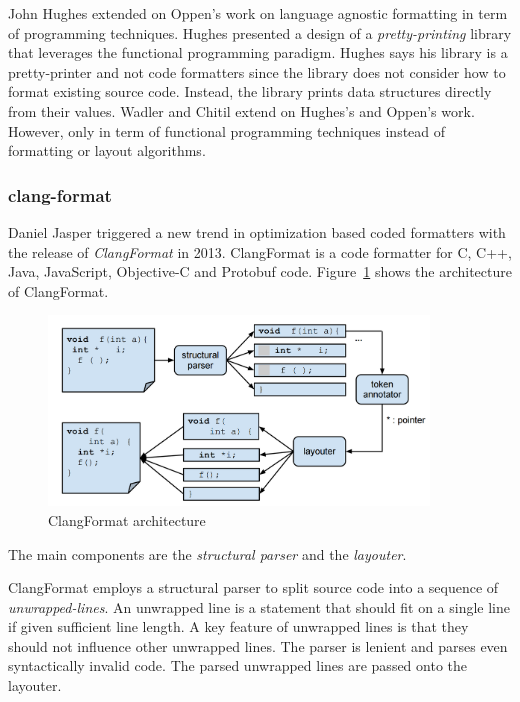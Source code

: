 John Hughes extended on Oppen's work on language agnostic formatting in term of programming techniques\autocite{hughes_design_1995}.
Hughes presented a design of a \emph{pretty-printing} library that leverages the functional programming paradigm.
Hughes says his library is a pretty-printer and not code formatters since the library does not consider how to format existing source code.
Instead, the library prints data structures directly from their values.
Wadler\autocite{wadler_prettier_2003} and Chitil\autocite{swierstra_linear_2009} extend on Hughes's and Oppen's work.
However, only in term of functional programming techniques instead of formatting or layout algorithms.


\subsubsection{clang-format}
Daniel Jasper triggered a new trend in optimization based coded formatters with the release of \emph{ClangFormat}\autocite{jasper_clang-format_2014} in 2013.
ClangFormat is a code formatter for C, C++, Java, JavaScript, Objective-C and Protobuf code.
Figure~\ref{fig:clang_format} shows the architecture of ClangFormat.
\begin{figure}
  \centering
  \includegraphics[width=0.9\textwidth]{img/clang-format.png}
  \caption{ClangFormat architecture}
  \label{fig:clang_format}
\end{figure}
The main components are the \emph{structural parser} and the \emph{layouter}.

ClangFormat employs a structural parser to split source code into a sequence of \emph{unwrapped-lines}.
An unwrapped line is a statement that should fit on a single line if given sufficient line length.
A key feature of unwrapped lines is that they should not influence other unwrapped lines.
The parser is lenient and parses even syntactically invalid code.
The parsed unwrapped lines are passed onto the layouter.

